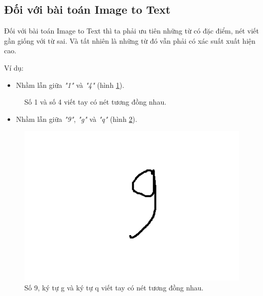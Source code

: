 \subsection{Đối với bài toán Image to Text}
Đối với bài toán Image to Text  thì ta phải ưu tiên những từ có đặc điểm, nét viết gần giống với từ sai. Và tất nhiên là những từ đó vẫn phải có xác suất xuất hiện cao.

Ví dụ:
\begin{itemize}
    \item Nhầm lẫn giữa \textit{"1"} và \textit{"4"} (hình \ref{fig:onefour}).
\end{itemize}
\begin{figure}[H]
    \centering
    \qquad
    \caption{Số 1 và số 4 viết tay có nét tương đồng nhau.}%
    \label{fig:onefour}
\end{figure}

\begin{itemize}
    \item Nhầm lẫn giữa \textit{"9"}, \textit{"g"} và \textit{"q"} (hình \ref{fig:ninegq}).
\end{itemize}
\begin{figure}[H]
	\centering
		\includegraphics[width=0.5\columnwidth]{chapter07/figure-sec4/9-g-q.png}
		\centering
	\caption{Số 9, ký tự g và ký tự q viết tay có nét tương đồng nhau.}
	\label{fig:ninegq}
\end{figure}

